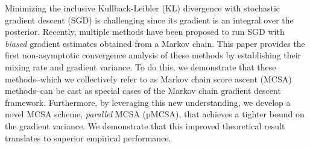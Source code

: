 
Minimizing the inclusive Kullback-Leibler (KL) divergence with stochastic gradient descent (SGD) is challenging since its gradient is an integral over the posterior.
Recently, multiple methods have been proposed to run SGD with \textit{biased} gradient estimates obtained from a Markov chain.
This paper provides the first non-asymptotic convergence analysis of these methods by establishing their mixing rate and gradient variance.
To do this, we demonstrate that these methods--which we collectively refer to as Markov chain score ascent (MCSA) methods--can be cast as special cases of the Markov chain gradient descent framework.
Furthermore, by leveraging this new understanding, we develop a novel MCSA scheme, \textit{parallel} MCSA (pMCSA), that achieves a tighter bound on the gradient variance.
We demonstrate that this improved theoretical result translates to superior empirical performance.



